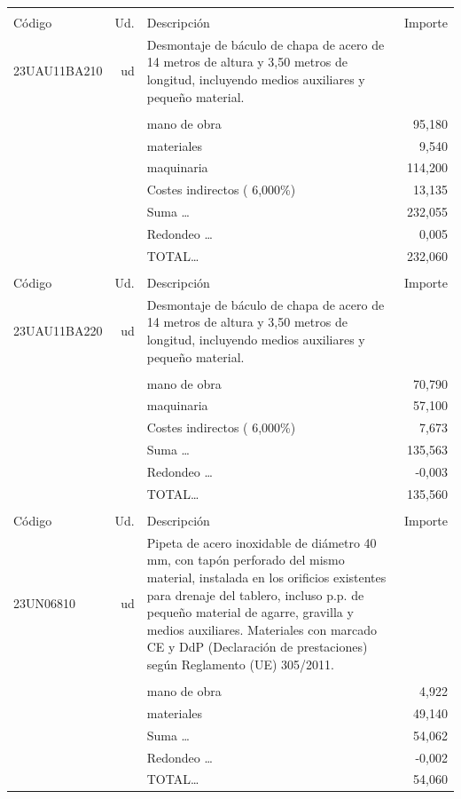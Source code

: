 \documentclass{book}%
\begin{document}
\begin{supertabular}{l r p{60mm} r}
&&&\\%
Código&Ud.&Descripción&Importe\\%
\hline%
23UAU11BA210&ud&Desmontaje de báculo de chapa de acero de 14 metros de altura y 3,50 metros de longitud, incluyendo medios auxiliares y pequeño material.&\\%
&&&\\%
&&mano de obra&    95,180\\%
&&materiales&     9,540\\%
&&maquinaria&   114,200\\%
&&Costes indirectos (     6,000\%)&    13,135\\%
&&Suma \ldots&   232,055\\%
&&Redondeo \ldots&     0,005\\%
%
&&TOTAL\ldots&   232,060\\%
&&&\\%
Código&Ud.&Descripción&Importe\\%
\hline%
23UAU11BA220&ud&Desmontaje de báculo de chapa de acero de 14 metros de altura y 3,50 metros de longitud, incluyendo medios auxiliares y pequeño material.&\\%
&&&\\%
&&mano de obra&    70,790\\%
&&maquinaria&    57,100\\%
&&Costes indirectos (     6,000\%)&     7,673\\%
&&Suma \ldots&   135,563\\%
&&Redondeo \ldots&    {-}0,003\\%
%
&&TOTAL\ldots&   135,560\\%
&&&\\%
Código&Ud.&Descripción&Importe\\%
\hline%
23UN06810&ud&Pipeta de acero inoxidable de diámetro 40 mm, con tapón perforado del mismo material, instalada en los orificios existentes para drenaje del tablero, incluso p.p. de pequeño material de agarre, gravilla y medios auxiliares. Materiales con marcado CE y DdP (Declaración de prestaciones) según Reglamento (UE) 305/2011.&\\%
&&&\\%
&&mano de obra&     4,922\\%
&&materiales&    49,140\\%
&&Suma \ldots&    54,062\\%
&&Redondeo \ldots&    {-}0,002\\%
%
&&TOTAL\ldots&    54,060\\%

\end{supertabular}
\end{document}
